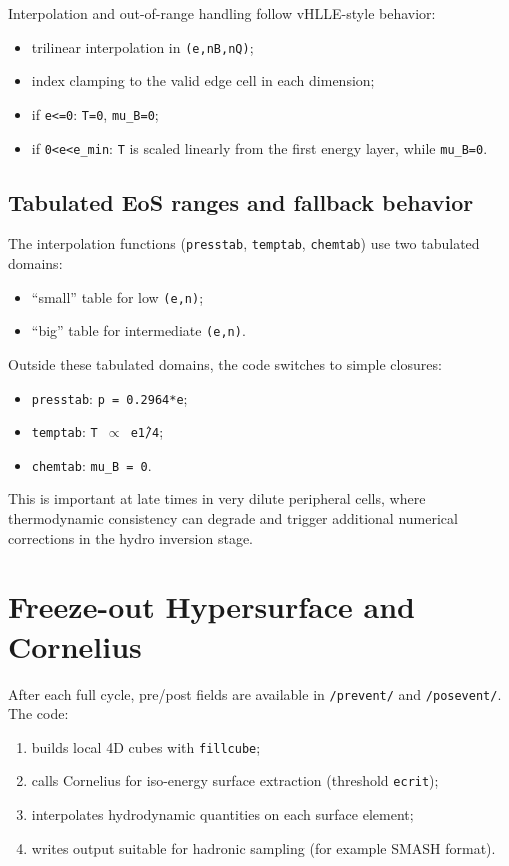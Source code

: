 \documentclass[11pt,a4paper]{article}
\begin{document}
Interpolation and out-of-range handling follow vHLLE-style behavior:
\begin{itemize}
\item trilinear interpolation in \texttt{(e,nB,nQ)};
\item index clamping to the valid edge cell in each dimension;
\item if \texttt{e<=0}: \texttt{T=0}, \texttt{mu\_B=0};
\item if \texttt{0<e<e\_min}: \texttt{T} is scaled linearly from the first
      energy layer, while \texttt{mu\_B=0}.
\end{itemize}

\subsection{Tabulated EoS ranges and fallback behavior}
The interpolation functions (\texttt{presstab}, \texttt{temptab},
\texttt{chemtab}) use two tabulated domains:
\begin{itemize}
\item ``small'' table for low \texttt{(e,n)};
\item ``big'' table for intermediate \texttt{(e,n)}.
\end{itemize}
Outside these tabulated domains, the code switches to simple closures:
\begin{itemize}
\item \texttt{presstab}: \texttt{p = 0.2964*e};
\item \texttt{temptab}: \texttt{T \(\propto\) e\^{1/4}};
\item \texttt{chemtab}: \texttt{mu\_B = 0}.
\end{itemize}
This is important at late times in very dilute peripheral cells, where
thermodynamic consistency can degrade and trigger additional numerical
corrections in the hydro inversion stage.

\section{Freeze-out Hypersurface and Cornelius}
After each full cycle, pre/post fields are available in
\texttt{/prevent/} and \texttt{/posevent/}. The code:
\begin{enumerate}
\item builds local 4D cubes with \texttt{fillcube};
\item calls Cornelius for iso-energy surface extraction (threshold \texttt{ecrit});
\item interpolates hydrodynamic quantities on each surface element;
\item writes output suitable for hadronic sampling (for example SMASH format).
\end{enumerate}
\end{document}
